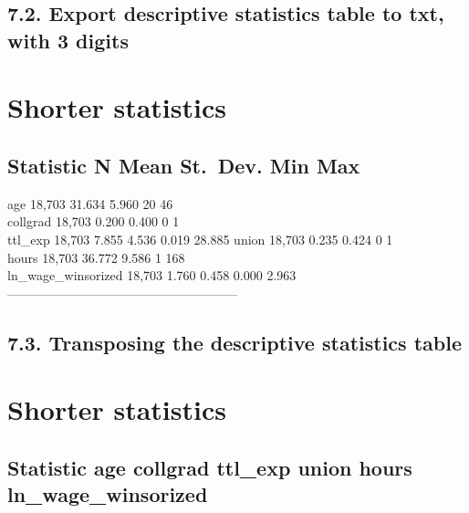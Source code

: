 \documentclass[
]{article}
\begin{document}
\hypertarget{export-descriptive-statistics-table-to-txt-with-3-digits}{%
\subsection{7.2. Export descriptive statistics table to txt, with 3
digits}\label{export-descriptive-statistics-table-to-txt-with-3-digits}}

\hypertarget{shorter-statistics-1}{%
\section{Shorter statistics}\label{shorter-statistics-1}}

\hypertarget{statistic-n-mean-st.-dev.-min-max-1}{%
\subsection{Statistic N Mean St.~Dev. Min
Max}\label{statistic-n-mean-st.-dev.-min-max-1}}

age 18,703 31.634 5.960 20 46\\
collgrad 18,703 0.200 0.400 0 1\\
ttl\_exp 18,703 7.855 4.536 0.019 28.885 union 18,703 0.235 0.424 0 1\\
hours 18,703 36.772 9.586 1 168\\
ln\_wage\_winsorized 18,703 1.760 0.458 0.000 2.963
------------------------------------------------------

\hypertarget{transposing-the-descriptive-statistics-table}{%
\subsection{7.3. Transposing the descriptive statistics
table}\label{transposing-the-descriptive-statistics-table}}

\hypertarget{shorter-statistics-2}{%
\section{Shorter statistics}\label{shorter-statistics-2}}

\hypertarget{statistic-age-collgrad-ttl_exp-union-hours-ln_wage_winsorized}{%
\subsection{Statistic age collgrad ttl\_exp union hours
ln\_wage\_winsorized}\label{statistic-age-collgrad-ttl_exp-union-hours-ln_wage_winsorized}}
\end{document}
